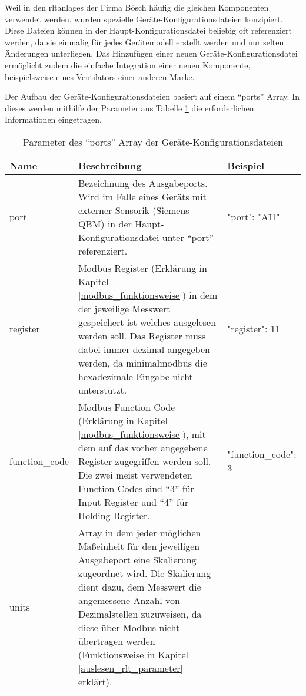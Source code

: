 \begin{enumerate}
	Weil in den \acsp{rltanlage} der Firma Bösch häufig die gleichen Komponenten verwendet werden, wurden spezielle Geräte-Konfigurationsdateien konzipiert. Diese Dateien können in der Haupt-Konfigurationsdatei beliebig oft referenziert werden, da sie einmalig für jedes Gerätemodell erstellt werden und nur selten Änderungen unterliegen. Das Hinzufügen einer neuen Geräte-Konfigurationsdatei ermöglicht zudem die einfache Integration einer neuen Komponente, beispielsweise eines Ventilators einer anderen Marke.
	
	Der Aufbau der Geräte-Konfigurationsdateien basiert auf einem \enquote{ports} Array. In dieses werden mithilfe der Parameter aus Tabelle \ref{tab:ports_array_parameter} die erforderlichen Informationen eingetragen.
	
	\begin{table}[H]
		\caption{Parameter des \enquote{ports} Array der Geräte-Konfigurationsdateien}
		\label{tab:ports_array_parameter}
		\begin{tabular}{p{} p{} | p{}}
			\toprule
			\textbf{Name} & \textbf{Beschreibung} & \textbf{Beispiel} \\
			\midrule
			port      	& Bezeichnung des Ausgabeports. Wird im Falle eines Geräts mit externer Sensorik (\zB Siemens QBM) in der Haupt-Konfigurationsdatei unter \enquote{port} referenziert. & 
			\begin{jsonTable}
"port": "AI1"
			\end{jsonTable} 
			\\
			register 	& Modbus Register (Erklärung in Kapitel \ref{modbus_funktionsweise}) in dem der jeweilige Messwert gespeichert ist \bzw welches ausgelesen werden soll. Das Register muss dabei immer dezimal angegeben werden, da minimalmodbus die hexadezimale Eingabe nicht unterstützt. & 
			\begin{jsonTable}
"register": 11
			\end{jsonTable} 
			\\
			function\_code 	& Modbus Function Code (Erklärung in Kapitel \ref{modbus_funktionsweise}), mit dem auf das vorher angegebene Register zugegriffen werden soll. Die zwei meist verwendeten Function Codes sind \enquote{3} für Input Register und \enquote{4} für Holding Register. & 
			\begin{jsonTable}
"function_code": 3
			\end{jsonTable} 
			\\
			units 	& Array in dem jeder möglichen Maßeinheit für den jeweiligen Ausgabeport eine Skalierung zugeordnet wird. Die Skalierung dient \zB dazu, dem Messwert die angemessene Anzahl von Dezimalstellen zuzuweisen, da diese über Modbus nicht übertragen werden (Funktionsweise in Kapitel \ref{auslesen_rlt_parameter} erklärt).
			

\end{tabular}
\end{table}
\end{enumerate}

